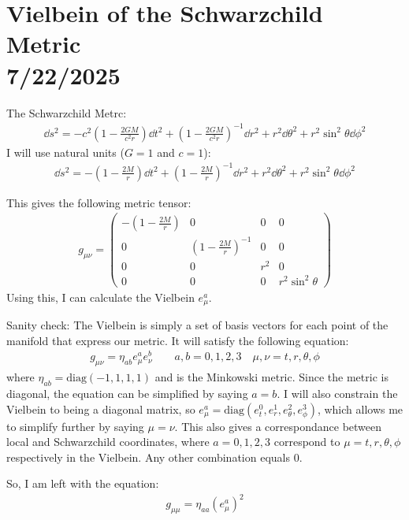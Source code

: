 \documentclass[12pt]{article}
\begin{document}
\section*{Vielbein of the Schwarzchild Metric \\ {\small 7/22/2025}}
The Schwarzchild Metrc:
\begin{align*}
  \dd{s}^2 = -c^2 \left(1 - \frac{2GM}{c^2r}\right)\dd{t}^2 + \left(1 - \frac{2GM}{c^2r}\right)^{-1}\dd{r}^2 + r^2\dd{\theta}^2 + r^2\sin^2{\theta}\dd{\phi}^2
\end{align*}
I will use natural units ($G = 1$ and $c = 1$):
\begin{align*}
  \dd{s}^2 = -\left(1 - \frac{2M}{r}\right)\dd{t}^2 + \left(1 - \frac{2M}{r}\right)^{-1}\dd{r}^2 + r^2\dd{\theta}^2 + r^2\sin^2{\theta}\dd{\phi}^2
\end{align*}

This gives the following metric tensor:
\begin{align*}
  g_{\mu\nu} =
  \begin{pmatrix}
  -\left(1 - \frac{2M}{r}\right) & 0 & 0 & 0 \\
  0 & \left(1 - \frac{2M}{r}\right)^{-1} & 0 & 0 \\
  0 & 0 & r^2 & 0 \\
  0 & 0 & 0 & r^2 \sin^2{\theta}
\end{pmatrix}
\end{align*}
Using this, I can calculate the Vielbein $e^a_\mu$.

Sanity check: The Vielbein is simply a set of basis vectors for each point of the manifold that express our metric. It will satisfy the following equation:
\begin{align*}
  g_{\mu\nu} = \eta_{ab}e^a_\mu e^b_\nu \qquad a,b = 0,1,2,3 \quad \mu,\nu = t,r,\theta,\phi
\end{align*}
where $\eta_{ab} = \text{diag}(-1,1,1,1)$ and is the Minkowski metric. Since the metric is diagonal, the equation can be simplified by saying $a=b$. I will also constrain the Vielbein to being a diagonal matrix, so $e^a_\mu = \text{diag}(e^0_t,e^1_r,e^2_\theta,e^3_\phi)$, which allows me to simplify further by saying $\mu = \nu$. This also gives a correspondance between local and Schwarzchild coordinates, where $a = 0,1,2,3$ correspond to $\mu = t,r,\theta,\phi$ respectively in the Vielbein. Any other combination equals $0$.

So, I am left with the equation:
\begin{align*}
  g_{\mu\mu} = \eta_{aa}(e^a_\mu)^2
\end{align*}
\end{document}
